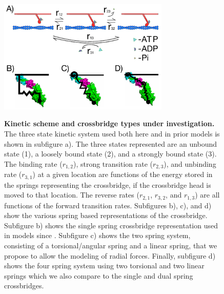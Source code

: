 \documentclass[]{article}
\begin{document}
\begin{figure}[p]
    \begin{center}
    \includegraphics[width=3.2in]{../imgs/Figure1.pdf}
    \label{fig:types}
    \caption{
        \textbf{Kinetic scheme and crossbridge types under investigation.} 
        The three state kinetic system used both here and in prior models is shown in subfigure a). The three states represented are an unbound state (1), a loosely bound state (2), and a strongly bound state (3). The binding rate ($r_{1,2}$), strong transition rate ($r_{2,3}$), and unbinding rate ($r_{3,1}$) at a given location are functions of the energy stored in the springs representing the crossbridge, if the crossbridge head is moved to that location. The reverse rates ($r_{2,1}$, $r_{3,2}$, and $r_{1,3}$) are all functions of the forward transition rates.
        Subfigures b), c), and d) show the various spring based representations of the crossbridge. Subfigure b) shows the single spring crossbridge representation used in models since \cite{Huxley1957e}. Subfigure c) shows the two spring system, consisting of a torsional/angular spring and a linear spring, that we propose to allow the modeling of radial forces. Finally, subfigure d) shows the four spring system using two torsional and two linear springs which we also compare to the single and dual spring crossbridges.
    }
    \end{center}
\end{figure}
\end{document}
